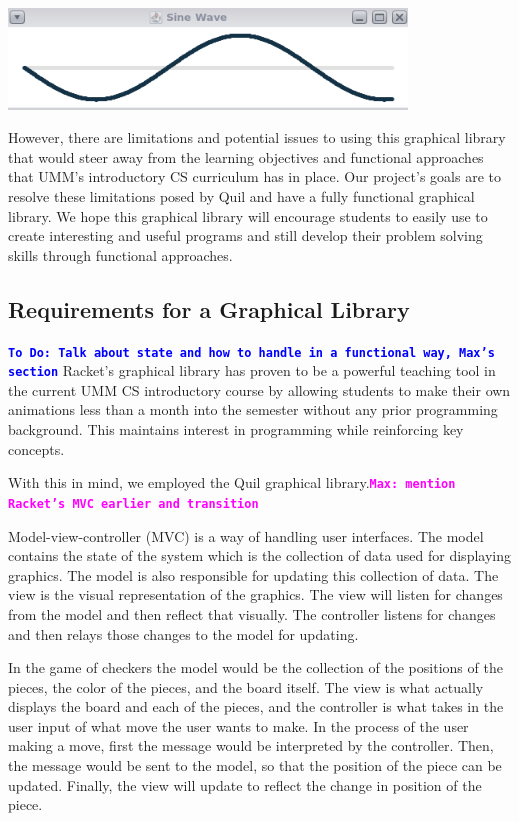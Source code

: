 \documentclass[12pt]{article}
\newcommand{\comment}[1]{{\bf \tt  {#1}}}
\newcommand{\todo}[1]{\textcolor{blue}{\comment{To Do: {#1}}}}
\newcommand{\mmcomment}[1]{\textcolor{magenta}{\comment{Max: {#1}}}}
\begin{document}
\begin{center}
\includegraphics[width=300pt]{sine-wave}
\end{center}

However, there are limitations and potential issues to using this graphical library that would steer away from the learning objectives and functional approaches that UMM's introductory CS curriculum has in place. Our project's goals are to resolve these limitations posed by Quil and have a fully functional graphical library. We hope this graphical library will encourage students to easily use to create interesting and useful programs and still develop their problem solving skills through functional approaches.


\subsection{Requirements for a Graphical Library}\label{subsec:requirements}
\todo{Talk about state and how to handle in a functional way, Max's section}
Racket's graphical library has proven to be a powerful teaching tool in the current UMM CS introductory course by allowing students to make their own animations less than a month into the semester without any prior programming background. This maintains interest in programming while reinforcing key concepts. 

With this in mind, we employed the Quil graphical library.\mmcomment{mention Racket's MVC earlier and transition}

Model-view-controller (MVC) is a way of handling user interfaces. The model contains the state of the system which is the collection of data used for displaying graphics. The model is also responsible for updating this collection of data. The view is the visual representation of the graphics. The view will listen for changes from the model and then reflect that visually. The controller listens for changes and then relays those changes to the model for updating. 

In the game of checkers the model would be the collection of the positions of the pieces, the color of the pieces, and the board itself. The view is what actually displays the board and each of the pieces, and the controller is what takes in the user input of what move the user wants to make. In the process of the user making a move, first the message would be interpreted by the controller. Then, the message would be sent to the model, so that the position of the piece can be updated. Finally, the view will update to reflect the change in position of the piece.
\end{document}
